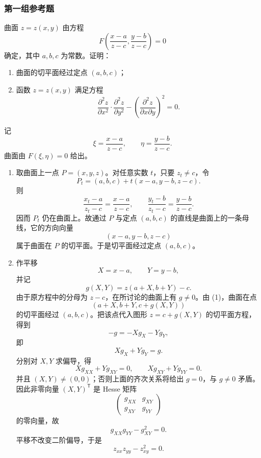 \subsubsection*{第一组参考题}
\begin{xreferenceproblem}[1]
曲面 $z=z(x,y)$ 由方程
  \[
    F\left(\frac{x-a}{z-c},\frac{y-b}{z-c}\right)=0
  \]
  确定，其中 $a,b,c$ 为常数。证明：
  \begin{enumerate}[label=(\arabic*)]
    \item 曲面的切平面经过定点 $(a,b,c)$；
    \item 函数 $z=z(x,y)$ 满足方程
    \[
      \frac{\partial^2z}{\partial x^2}\cdot\frac{\partial^2z}{\partial y^2}
      -\left(\frac{\partial^2z}{\partial x\partial y}\right)^2=0.
    \]
  \end{enumerate}
\end{xreferenceproblem}
\begin{xsolution}
记
\[
  \xi=\frac{x-a}{z-c},
  \qquad
  \eta=\frac{y-b}{z-c}.
\]
曲面由 $F(\xi,\eta)=0$ 给出。

\begin{enumerate}[label=(\arabic*)]
  \item 取曲面上一点 $P=(x,y,z)$。对任意实数 $t$，只要 $z_t\ne c$，令
  \[
    P_t=(a,b,c)+t(x-a,y-b,z-c).
  \]
  则
  \[
    \frac{x_t-a}{z_t-c}=\frac{x-a}{z-c},
    \qquad
    \frac{y_t-b}{z_t-c}=\frac{y-b}{z-c}.
  \]
  因而 $P_t$ 仍在曲面上。故通过 $P$ 与定点 $(a,b,c)$ 的直线是曲面上的一条母线，它的方向向量
  \[
    (x-a,y-b,z-c)
  \]
  属于曲面在 $P$ 的切平面。于是切平面经过定点 $(a,b,c)$。

  \item 作平移
  \[
    X=x-a,\qquad Y=y-b,
  \]
  并记
  \[
    g(X,Y)=z(a+X,b+Y)-c.
  \]
  由于原方程中的分母为 $z-c$，在所讨论的曲面上有 $g\ne0$。由 (1)，曲面在点
  \[
    (a+X,b+Y,c+g(X,Y))
  \]
  的切平面经过 $(a,b,c)$。把该点代入图形 $z=c+g(X,Y)$ 的切平面方程，得到
  \[
    -g=-Xg_X-Yg_Y,
  \]
  即
  \[
    Xg_X+Yg_Y=g.
  \]
  分别对 $X,Y$ 求偏导，得
  \[
    Xg_{XX}+Yg_{XY}=0,
    \qquad
    Xg_{XY}+Yg_{YY}=0.
  \]
  并且 $(X,Y)\ne(0,0)$；否则上面的齐次关系将给出 $g=0$，与 $g\ne0$ 矛盾。因此非零向量 $(X,Y)^{\mathsf T}$ 是 Hesse 矩阵
  \[
    \begin{pmatrix}g_{XX}&g_{XY}\\g_{XY}&g_{YY}\end{pmatrix}
  \]
  的零向量，故
  \[
    g_{XX}g_{YY}-g_{XY}^2=0.
  \]
  平移不改变二阶偏导，于是
  \[
    z_{xx}z_{yy}-z_{xy}^2=0.
  \]
\end{enumerate}
\end{xsolution}


